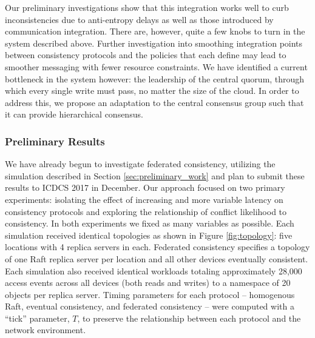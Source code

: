 \documentclass{article}
\begin{document}
Our preliminary investigations show that this integration works well to curb inconsistencies due to anti-entropy delays as well as those introduced by communication integration. There are, however, quite a few knobs to turn in the system described above. Further investigation into smoothing integration points between consistency protocols and the policies that each define may lead to smoother messaging with fewer resource constraints. We have identified a current bottleneck in the system however: the leadership of the central quorum, through which every single write must pass, no matter the size of the cloud. In order to address this, we propose an adaptation to the central consensus group such that it can provide hierarchical consensus.

\subsubsection{Preliminary Results}
\label{sec:federated_results}

We have already begun to investigate federated consistency, utilizing the simulation described in Section \ref{sec:preliminary_work} and plan to submit these results to ICDCS 2017 in December. Our approach focused on two primary experiments: isolating the effect of increasing and more variable latency on consistency protocols and exploring the relationship of conflict likelihood to consistency. In both experiments we fixed as many variables as possible. Each simulation received identical topologies as shown in Figure \ref{fig:topology}: five locations with 4 replica servers in each. Federated consistency specifies a topology of one Raft replica server per location and all other devices eventually consistent. Each simulation also received identical workloads totaling approximately 28,000 access events across all devices (both reads and writes) to a namespace of 20 objects per replica server. Timing parameters for each protocol -- homogenous Raft, eventual consistency, and federated consistency -- were computed with a ``tick'' parameter, $T$, to preserve the relationship between each protocol and the network environment.
\end{document}
